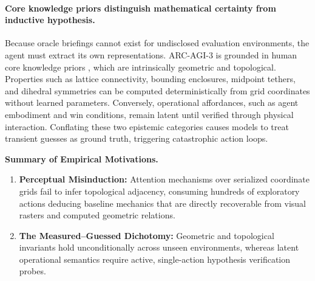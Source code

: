 \paragraph{Core knowledge priors distinguish mathematical certainty from inductive hypothesis.}
Because oracle briefings cannot exist for undisclosed evaluation environments, the agent must extract its own representations. 
ARC-AGI-3 is grounded in human core knowledge priors \citep{spelke2007core}, which are intrinsically geometric and topological. 
Properties such as lattice connectivity, bounding enclosures, midpoint tethers, and dihedral symmetries can be computed deterministically from grid coordinates without learned parameters. 
Conversely, operational affordances, such as agent embodiment and win conditions, remain latent until verified through physical interaction. 
Conflating these two epistemic categories causes models to treat transient guesses as ground truth, triggering catastrophic action loops.

\begin{tintbox}
\small\textbf{Summary of Empirical Motivations.}
\begin{enumerate}
    \item \textbf{Perceptual Misinduction:} Attention mechanisms over serialized coordinate grids fail to infer topological adjacency, consuming hundreds of exploratory actions deducing baseline mechanics that are directly recoverable from visual rasters and computed geometric relations.
    \item \textbf{The Measured--Guessed Dichotomy:} Geometric and topological invariants hold unconditionally across unseen environments, whereas latent operational semantics require active, single-action hypothesis verification probes.
\end{enumerate}
\end{tintbox}
